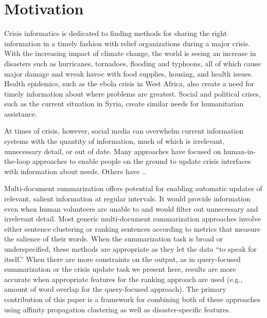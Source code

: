 \section{Motivation}


Crisis informatics\cite{?} is dedicated to finding methods for sharing the
right information in a timely fashion with relief organizations during a major crisis. With the
increasing impact of climate change, the world is seeing an increase in
disasters such as hurricanes, tornadoes, flooding and typhoons, all of which
cause major damage and wreak havoc with food supplies, housing, and health
issues. Health epidemics, such as the ebola crisis in West Africa, also create
a need for timely information about where problems are greatest. Social and
political 
crises, such as the current situation in Syria, create similar needs for
humanitarian assistance.

At times of crisis, however, social media can overwhelm current information
systems with the quantity of information, much of which is irrelevant,
unnecessary detail, or out of date. Many approaches have focused on
human-in-the-loop approaches \cite{?} to enable people on the ground to update
crisis interfaces with information about needs. Others have ..








Multi-document summarization offers potential for enabling automatic updates of
relevant, salient information at regular intervals. It would provide
information even when human volunteers are unable to and would filter out
unnecessary and irrelevant detail. 
Most generic multi-document summarization approaches involve either sentence 
clustering or ranking sentences according to metrics that measure the salience
of their words. 
When the summarization task
is broad or underspecified,
these methods are appropriate as they let the data
``to speak for itself.''
When there are more constraints on the output, as in query-focused
summarization or the crisis update task we present here,
results are more accurate when
appropriate features for the ranking approach are used (e.g., amount of word
overlap for the query-focused approach).
The primary contribution of this paper
is a framework for combining both of these approaches using affinity
propagation clustering as well as disaster-specific features.

